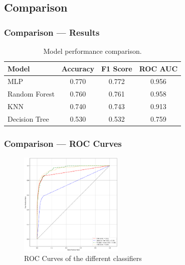 \documentclass[10pt, aspectratio=169]{beamer}
\begin{document}
\subsection{Comparison}
\begin{frame}
    \frametitle{Comparison --- Results}
    \begin{table}[h!]
        \centering
        \begin{tabular}{|l|c|c|c|}
        \hline
        \textbf{Model}         & \textbf{Accuracy} & \textbf{F1 Score } & \textbf{ROC AUC } \\ \hline
        MLP                    & 0.770             & 0.772                       & 0.956                   \\ \hline
        Random Forest          & 0.760             & 0.761                       & 0.958                   \\ \hline
        KNN                    & 0.740             & 0.743                       & 0.913                   \\ \hline
        Decision Tree          & 0.530             & 0.532                       & 0.759                   \\ \hline
       
        
        \end{tabular}
        \caption{Model performance comparison.}
        \label{tab:model_performance}
        \end{table}

\end{frame}
\begin{frame}
    \frametitle{Comparison --- ROC Curves}
    \begin{figure}
        \centering
        \includegraphics[width=0.44\textwidth]{img/roc.png}
        \caption{ROC Curves of the different classifiers}
    \end{figure}
\end{frame}
\end{document}
